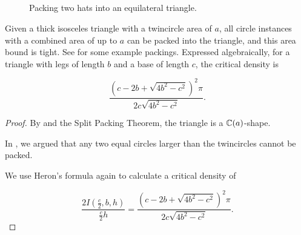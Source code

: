 \documentclass[a4paper,style=print,bibliography=totoc,nexus,lnum,extramargin]{tubsbook}
\begin{document}
\begin{figure}
    ~
    ~

    \vspace{10pt}

    ~
    ~

    \caption{Packing two hats into an equilateral triangle.}
    \label{fig:hats-in-iso}
\end{figure}

\begin{theorem}\label{th:iso}
    Given a thick isosceles triangle with a twincircle area of $a$, all circle instances with a combined area of up to $a$ can be packed into the triangle, and this area bound is tight.
    See  for some example packings.
    Expressed algebraically, for a triangle with legs of length $b$ and a base of length $c$, the critical density is

    $$\frac{(c-2b+\sqrt{4b^2-c^2})^2\pi}{2c\sqrt{4b^2-c^2}}.$$
\end{theorem}

\begin{proof}
    By  and the Split Packing Theorem, the triangle is a $\mathbb{C}(a)$-shape.

    In , we argued that any two equal circles larger than the twincircles cannot be packed.

    We use Heron's formula again to calculate a critical density of

    $$\frac{2I(\frac{c}{2}, b, h)}{\frac{c}{2}h} = \frac{(c-2b+\sqrt{4b^2-c^2})^2\pi}{2c\sqrt{4b^2-c^2}}.$$
\end{proof}
\end{document}
